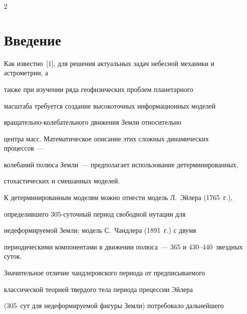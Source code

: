 




      \thispagestyle{headings}





      \begin{multicols}{2}


      


            \label{st\stat}





\section{Введение}





Как известно~[1], для решения актуальных задач небесной механики и астрометрии, а


также при изучении ряда геофизических проблем планетарного


масштаба требуется создание высокоточных информационных моделей


вра\-ща\-тель\-но-ко\-ле\-ба\-тель\-но\-го движения Земли относительно 


центра масс. Математическое описание этих сложных динамических процессов~---


колебаний полюса Земли~--- предполагает использование детерминированных,


стохастических и смешанных моделей.





К детерминированным моделям можно отнести модель Л.~Эйлера (1765~г.), 


определившего 305-су\-точ\-ный период свободной нутации для


недеформируемой Земли; модель С.~Чандлера (1891~г.) с двумя


периодическими компонентами в движении полюса~--- 365 и 430--440~звездных суток.





Значительное отличие чандлеровского  периода от предписываемого


классической теорией твердого тела периода прецессии Эйлера


(305~сут для недеформируемой фигуры Земли) потребовало дальнейшего



\end{multicols}
